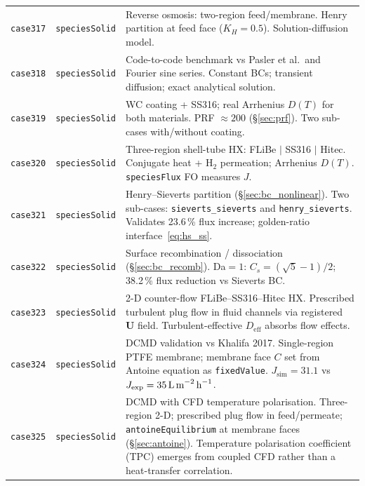 \documentclass[11pt,a4paper]{article}
\newcommand{\caseref}[1]{\texttt{\color{casegreen}#1}}
\newcommand{\bctype}[1]{\texttt{\color{foamblue}#1}}
\begin{document}
\begin{longtable}{%
  >{\raggedright\arraybackslash}p{1.8cm}
  >{\raggedright\arraybackslash}p{5.0cm}
  p{\dimexpr\linewidth-1.8cm-5.0cm-4\tabcolsep\relax}}
\caseref{case317} & \texttt{speciesSolid} &
  Reverse osmosis: two-region feed/membrane.
  Henry partition at feed face ($K_H = 0.5$).  Solution-diffusion model. \\[2pt]

\caseref{case318} & \texttt{speciesSolid} &
  Code-to-code benchmark vs Pasler et al.\ and Fourier sine series.
  Constant BCs; transient diffusion; exact analytical solution. \\[2pt]

\caseref{case319} & \texttt{speciesSolid} &
  WC coating + SS316; real Arrhenius $D(T)$ for both materials.
  PRF $\approx 200$ (§\ref{sec:prf}).  Two sub-cases with/without coating. \\[2pt]

\caseref{case320} & \texttt{speciesSolid} &
  Three-region shell-tube HX: FLiBe $|$ SS316 $|$ Hitec.
  Conjugate heat + H$_2$ permeation; Arrhenius $D(T)$.
  \texttt{speciesFlux} FO measures $J$. \\[2pt]

\caseref{case321} & \texttt{speciesSolid} &
  Henry--Sieverts partition (§\ref{sec:bc_nonlinear}).
  Two sub-cases: \texttt{sieverts\_sieverts} and \texttt{henry\_sieverts}.
  Validates 23.6\,\% flux increase; golden-ratio interface~\eqref{eq:hs_ss}. \\[2pt]

\caseref{case322} & \texttt{speciesSolid} &
  Surface recombination / dissociation (§\ref{sec:bc_recomb}).
  Da$=1$: $C_s = (\sqrt{5}-1)/2$; 38.2\,\% flux reduction vs Sieverts BC. \\[2pt]

\caseref{case323} & \texttt{speciesSolid} &
  2-D counter-flow FLiBe--SS316--Hitec HX.
  Prescribed turbulent plug flow in fluid channels via registered $\mathbf{U}$ field.
  Turbulent-effective $D_\text{eff}$ absorbs flow effects. \\[2pt]

\caseref{case324} & \texttt{speciesSolid} &
  DCMD validation vs Khalifa 2017.  Single-region PTFE membrane;
  membrane face $C$ set from Antoine equation as \texttt{fixedValue}.
  $J_\text{sim} = 31.1$ vs $J_\text{exp} = 35\,\text{L\,m}^{-2}\,\text{h}^{-1}$. \\[2pt]

\caseref{case325} & \texttt{speciesSolid} &
  DCMD with CFD temperature polarisation.  Three-region 2-D; prescribed plug
  flow in feed/permeate; \bctype{antoineEquilibrium} at membrane faces
  (§\ref{sec:antoine}).  Temperature polarisation coefficient (TPC) emerges
  from coupled CFD rather than a heat-transfer correlation. \\[2pt]


\end{longtable}
\end{document}
